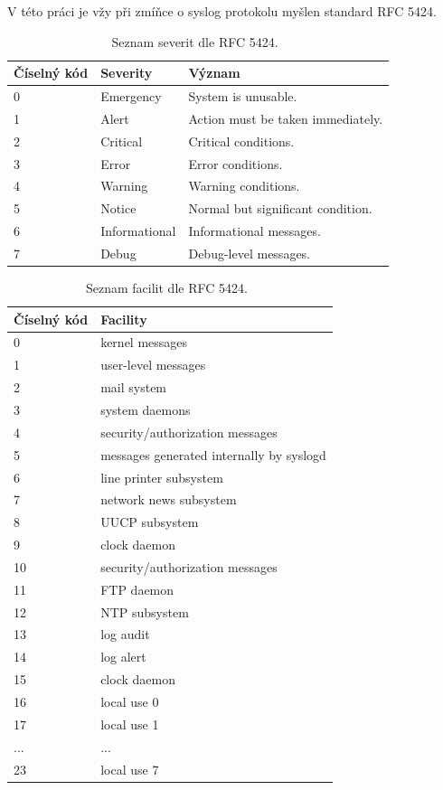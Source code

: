 \documentclass[thesis=B,czech]{FITthesis}[2012/06/26]
\begin{document}
V této práci je vžy při zmíňce o syslog protokolu myšlen standard RFC 5424.

\begin{table}[ht]
\centering
	\caption[Tabulka severit podle RFC 5424]{Seznam severit dle RFC 5424.~\cite{RFC5424}}
	\begin{tabular}{|l|l|l|}\hline
		Číselný kód	& Severity & Význam	\tabularnewline \hline \hline
		0		& Emergency	&	System is unusable. \tabularnewline \hline
		1		& Alert		&	Action must be taken immediately. \tabularnewline \hline
		2		& Critical	&	Critical conditions. \tabularnewline \hline
		3		& Error		&	Error conditions.	\tabularnewline \hline
		4		& Warning	&	Warning conditions. \tabularnewline \hline
		5		& Notice		&	Normal but significant condition. \tabularnewline \hline
		6		& Informational & Informational messages. \tabularnewline \hline
		7		& Debug		&	Debug-level messages. \tabularnewline \hline
	\end{tabular}
\end{table}

\begin{table}[ht]   %
\centering
	\caption[Tabulka facilit podle RFC 5424]{Seznam facilit dle RFC 5424.~\cite{RFC5424}}
	\begin{tabular}{|l|l|}\hline
		Číselný kód & Facility			\tabularnewline \hline \hline
		0		& kernel messages		\tabularnewline \hline
		1		& user-level messages	\tabularnewline \hline
		2		& mail system			\tabularnewline \hline
		3		& system daemons			\tabularnewline \hline
		4		& security/authorization messages			\tabularnewline \hline
		5		& messages generated internally by syslogd	\tabularnewline \hline
		6		& line printer subsystem		\tabularnewline \hline
		7		& network news subsystem		\tabularnewline \hline
		8		& UUCP subsystem			\tabularnewline \hline
		9		& clock daemon			\tabularnewline \hline
		10		& security/authorization messages			\tabularnewline \hline
		11		& FTP daemon				\tabularnewline \hline
		12		& NTP subsystem			\tabularnewline \hline
		13		& log audit				\tabularnewline \hline
		14		& log alert				\tabularnewline \hline
		15		& clock daemon			\tabularnewline \hline
		16		& local use 0			\tabularnewline \hline
		17		& local use 1			\tabularnewline \hline
		...		& ...					\tabularnewline \hline
		23		& local use 7			\tabularnewline \hline
	\end{tabular}
\end{table}
\end{document}
